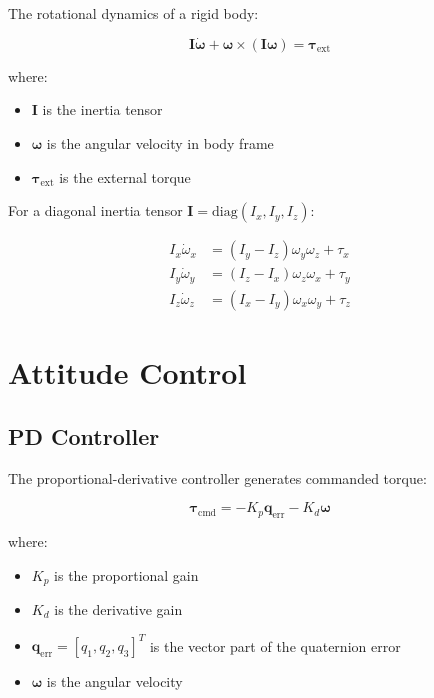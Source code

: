 \documentclass[11pt,a4paper]{article}
\newcommand{\vect}[1]{\bm{#1}}
\newcommand{\mat}[1]{\mathbf{#1}}
\begin{document}
The rotational dynamics of a rigid body:

\begin{equation}
    \mat{I} \dot{\vect{\omega}} + \vect{\omega} \times (\mat{I} \vect{\omega}) = \vect{\tau}_\text{ext}
    \label{eq:euler}
\end{equation}

where:
\begin{itemize}
    \item $\mat{I}$ is the inertia tensor
    \item $\vect{\omega}$ is the angular velocity in body frame
    \item $\vect{\tau}_\text{ext}$ is the external torque
\end{itemize}

For a diagonal inertia tensor $\mat{I} = \text{diag}(I_x, I_y, I_z)$:

\begin{align}
    I_x \dot{\omega}_x &= (I_y - I_z) \omega_y \omega_z + \tau_x \\
    I_y \dot{\omega}_y &= (I_z - I_x) \omega_z \omega_x + \tau_y \\
    I_z \dot{\omega}_z &= (I_x - I_y) \omega_x \omega_y + \tau_z
\end{align}

\section{Attitude Control}

\subsection{PD Controller}

The proportional-derivative controller generates commanded torque:

\begin{equation}
    \vect{\tau}_\text{cmd} = -K_p \vect{q}_\text{err} - K_d \vect{\omega}
    \label{eq:pd}
\end{equation}

where:
\begin{itemize}
    \item $K_p$ is the proportional gain
    \item $K_d$ is the derivative gain
    \item $\vect{q}_\text{err} = [q_1, q_2, q_3]^T$ is the vector part of the quaternion error
    \item $\vect{\omega}$ is the angular velocity
\end{itemize}
\end{document}
